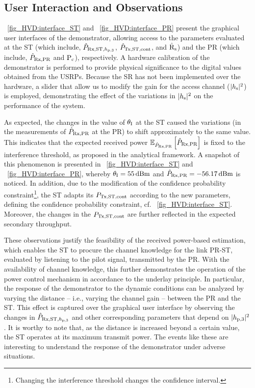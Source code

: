 \subsection{User Interaction and Observations}
\figurename~\ref{fig_HVD:interface_ST} and \figurename~\ref{fig_HVD:interface_PR} present the graphical user interfaces of the demonstrator, allowing access to the parameters evaluated at the ST (which include, $\hat{P}_{\text{Rx,ST,$h_{\text{p,3}}$}}$, $\hat{P}_{\text{Tx,ST,cont}}$, and $\hat{\text{{R}}}_{\text{s}}$) and the PR (which include, $\hat{P}_{\text{Rx,PR}}$ and $\text{P}_{\text{c}}$), respectively. A hardware calibration of the demonstrator is performed to provide physical significance to the digital values obtained from the USRPs. Because the SR has not been implemented over the hardware, a slider that allow us to modify the gain for the access channel ($|h_{\text{s}}|^2$) is employed, demonstrating the effect of the variations in $|h_{\text{s}}|^2$ on the performance of the system. %

As expected, the changes in the value of $\theta_{\text{I}}$ at the ST caused the variations (in the measurements of $\hat{P}_{\text{Rx,PR}}$ at the PR) to shift approximately to the same value. This indicates that the expected received power ${\mathbb E}_{\hat{P}_{\text{Rx,PR}}}\left[ \hat{P}_{\text{Rx,PR}} \right]$ is fixed to the interference threshold, as proposed in the analytical framework. A snapshot of this phenomenon is presented in \figurename~\ref{fig_HVD:interface_ST} and \figurename~\ref{fig_HVD:interface_PR}, whereby $\theta_{\text{I}} = \SI{55}{dBm}$ and $\hat{P}_{\text{Rx,PR}} = \SI{-56.17}{dBm}$ is noticed. In addition, due to the modification of the confidence probability constraint\footnote{Changing the interference threshold changes the confidence interval.}, the ST adapts its $P_{\text{Tx,ST,cont}}$ according to the new parameters, defining the confidence probability constraint, cf. \figurename~\ref{fig_HVD:interface_ST}. Moreover, the changes in the $P_{\text{Tx,ST,cont}}$ are further reflected in the expected secondary throughput. 

These observations justify the feasibility of the received power-based estimation, which enables the ST to procure the channel knowledge for the link PR-ST, evaluated by listening to the pilot signal, transmitted by the PR. With the availability of channel knowledge, this further demonstrates the operation of the power control mechanism in accordance to the underlay principle. In particular, the response of the demonstrator to the dynamic conditions can be analyzed by varying the distance -- i.e., varying the channel gain -- between the PR and the ST. This effect is captured over the graphical user interface by observing the changes in $\hat{P}_{\text{Rx,ST,$h_{\text{p,3}}$}}$ and other corresponding parameters that depend on $|h_{\text{p,3}}|^2$. It is worthy to note that, as the distance is increased beyond a certain value, the ST operates at its maximum transmit power. The events like these are interesting to understand the response of the demonstrator under adverse situations.%

